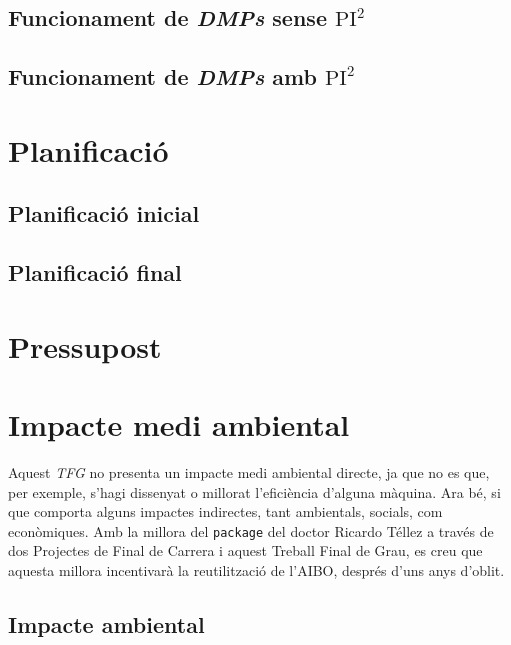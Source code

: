 \documentclass[12pt,a4paper,final,twoside]{report}
\begin{document}
\section{Funcionament de \textit{DMPs} sense $\mathrm{PI^2}$}



\section{Funcionament de \textit{DMPs} amb $\mathrm{PI^2}$}


\chapter{Planificació}
\label{Planificacio}

\section{Planificació inicial}


\section{Planificació final}


\chapter{Pressupost}
\label{Pressupost}


\chapter{Impacte medi ambiental}
\label{Impacte-medi-ambiental}

Aquest \textit{TFG} no presenta un impacte medi ambiental directe, ja que no es que, per exemple, s'hagi dissenyat o millorat l'eficiència d'alguna màquina. Ara bé, si que comporta alguns impactes indirectes, tant ambientals, socials, com econòmiques. Amb la millora del \texttt{package} del doctor Ricardo Téllez a través de dos Projectes de Final de Carrera i aquest Treball Final de Grau, es creu que aquesta millora incentivarà la reutilització de l'AIBO, després d'uns anys d'oblit. 

\section{Impacte ambiental}
\end{document}
